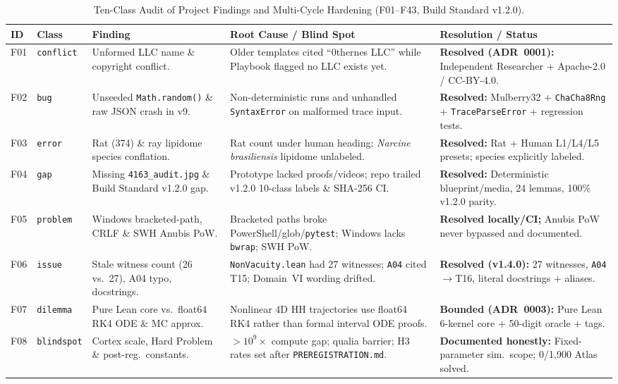 \documentclass[11pt,letterpaper]{amsart}
\begin{document}
\begin{table}[htbp]
\centering
\caption{Ten-Class Audit of Project Findings and Multi-Cycle Hardening (F01--F43, Build Standard v1.2.0).}
\label{tab:findings}
\scriptsize
\begin{tabularx}{\textwidth}{@{}ll>{\raggedright\arraybackslash}p{3.05cm}>{\raggedright\arraybackslash}p{4.35cm}L@{}}
\toprule
\textbf{ID} & \textbf{Class} & \textbf{Finding} & \textbf{Root Cause / Blind Spot} & \textbf{Resolution / Status} \\
\midrule
F01 & \texttt{conflict} & Unformed LLC name \& copyright conflict. & Older templates cited ``0thernes LLC'' while Playbook flagged no LLC exists yet. & \textbf{Resolved (ADR~0001):} Independent Researcher + Apache-2.0 / CC-BY-4.0. \\
F02 & \texttt{bug} & Unseeded \texttt{Math.random()} \& raw JSON crash in v9. & Non-deterministic runs and unhandled \texttt{SyntaxError} on malformed trace input. & \textbf{Resolved:} Mulberry32 + \texttt{ChaCha8Rng} + \texttt{TraceParseError} + regression tests. \\
F03 & \texttt{error} & Rat (374) \& ray lipidome species conflation. & Rat count under human heading; \emph{Narcine brasiliensis} lipidome unlabeled. & \textbf{Resolved:} Rat + Human L1/L4/L5 presets; species explicitly labeled. \\
F04 & \texttt{gap} & Missing \texttt{4163\_audit.jpg} \& Build Standard v1.2.0 gap. & Prototype lacked proofs/videos; repo trailed v1.2.0 10-class labels \& SHA-256 CI. & \textbf{Resolved:} Deterministic blueprint/media, 24 lemmas, 100\% v1.2.0 parity. \\
F05 & \texttt{problem} & Windows bracketed-path, CRLF \& SWH Anubis PoW. & Bracketed paths broke PowerShell/glob/\texttt{pytest}; Windows lacks \texttt{bwrap}; SWH PoW. & \textbf{Resolved locally/CI;} Anubis PoW never bypassed and documented. \\
F06 & \texttt{issue} & Stale witness count (26 vs.\ 27), A04 typo, docstrings. & \texttt{NonVacuity.lean} had 27 witnesses; \texttt{A04} cited T15; Domain~VI wording drifted. & \textbf{Resolved (v1.4.0):} 27 witnesses, \texttt{A04}$\to$T16, literal docstrings + aliases. \\
F07 & \texttt{dilemma} & Pure Lean core vs.\ float64 RK4 ODE \& MC approx. & Nonlinear 4D HH trajectories use float64 RK4 rather than formal interval ODE proofs. & \textbf{Bounded (ADR~0003):} Pure Lean 6-kernel core + 50-digit oracle + tags. \\
F08 & \texttt{blindspot} & Cortex scale, Hard Problem \& post-reg.\ constants. & $>10^9\times$ compute gap; qualia barrier; H3 rates set after \texttt{PREREGISTRATION.md}. & \textbf{Documented honestly:} Fixed-parameter sim.\ scope; 0/1,900 Atlas solved. \\

\end{tabularx}
\end{table}
\end{document}
